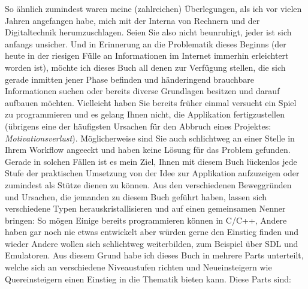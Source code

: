 \documentclass[b5paper,10pt,dvips,fleqn,titlepage,twoside]{book}
\begin{document}
So ähnlich zumindest waren meine (zahlreichen) \"{U}berlegungen, als ich vor vielen Jahren angefangen habe, mich mit der Interna von Rechnern und der Digitaltechnik herumzuschlagen. Seien Sie also nicht beunruhigt, jeder ist sich anfangs unsicher. Und in Erinnerung an die Problematik dieses Beginns (der heute in der riesigen F\"{ü}lle an Informationen im Internet immerhin erleichtert worden ist), m\"{o}chte ich dieses Buch all denen zur Verf\"{u}gung stellen, die sich gerade inmitten jener Phase befinden und händeringend brauchbare Informationen suchen oder bereits diverse Grundlagen besitzen und darauf aufbauen m\"{o}chten.\newline
Vielleicht haben Sie bereits früher einmal versucht ein Spiel zu programmieren und es gelang Ihnen nicht, die Applikation fertigzustellen (übrigens eine der häufigsten Ursachen für den Abbruch eines Projektes: \textit{Motivationsverlust}). Möglicherweise sind Sie auch schlichtweg an einer Stelle in Ihrem Workflow angeeckt und haben keine Lösung für das Problem gefunden.
Gerade in solchen Fällen ist es mein Ziel, Ihnen mit diesem Buch lückenlos jede Stufe der praktischen Umsetzung von der Idee zur Applikation aufzuzeigen oder zumindest als Stütze dienen zu können.
Aus den verschiedenen Beweggründen und Ursachen, die jemanden zu diesem Buch geführt haben, lassen sich verschiedene Typen herauskristallisieren und auf einen gemeinsamen Nenner bringen: So mögen Einige bereits programmieren können in C/C++, Andere haben gar noch nie etwas entwickelt aber würden gerne den Einstieg finden und wieder Andere wollen sich schlichtweg weiterbilden, zum Beispiel über SDL und Emulatoren. Aus diesem Grund habe ich dieses Buch in mehrere Parts unterteilt, welche sich an verschiedene Niveaustufen richten und Neueinsteigern wie Quereinsteigern einen Einstieg in die Thematik bieten kann. Diese Parts sind:
\newline
\end{document}
